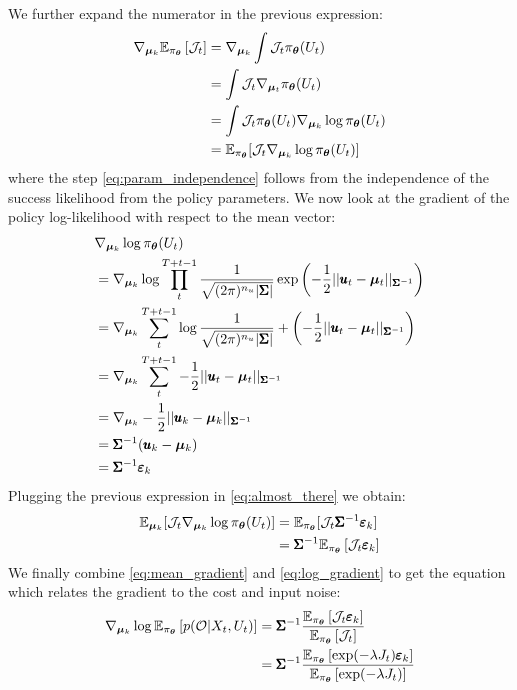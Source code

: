  We further expand the numerator in the previous expression:
\begin{align}
    \nabla_{\boldsymbol{\mu}_k} \mathbb{E}_{\pi_{\boldsymbol{\theta}}} \left [\mathcal{J}_t\right] 
    &= \nabla_{\boldsymbol{\mu}_k} \int \mathcal{J}_t \pi_{\boldsymbol{\theta}}(U_t) \label{eq:param_independence}\\
    &= \int \mathcal{J}_t \nabla_{\boldsymbol{\mu}_t} \pi_{\boldsymbol{\theta}}(U_t) \\
    &= \int \mathcal{J}_t \pi_{\boldsymbol{\theta}}(U_t) \nabla_{\boldsymbol{\mu}_k} \log \pi_{\boldsymbol{\theta}}(U_t) \\
    &= \mathbb{E}_{\pi_{\boldsymbol{\theta}}} [\mathcal{J}_t \nabla_{\boldsymbol{\mu}_k} \log \pi_{\boldsymbol{\theta}}(U_t)] \label{eq:almost_there}
\end{align}
where the step \eqref{eq:param_independence} follows from the independence of the success likelihood from the policy parameters. We now look at the gradient of the policy log-likelihood with respect to the mean vector:
\begin{align}
    &\nabla_{\boldsymbol{\mu}_k} \log \pi_{\boldsymbol{\theta}}(U_t) \\
    &= \nabla_{\boldsymbol{\mu}_k} \log \prod_{t}^{T+t-1} \frac{1}{\sqrt{(2\pi)^{n_u}|\pmb{\Sigma}|}}\exp\left(-\frac{1}{2}||\pmb{u}_t - \boldsymbol{\mu}_t||_{\pmb{\Sigma}^{-1}}\right) \\
    &= \nabla_{\boldsymbol{\mu}_k} \sum_{t}^{T+t-1} \log \frac{1}{\sqrt{(2\pi)^{n_u}|\pmb{\Sigma}|}} + \left(-\frac{1}{2}||\pmb{u}_t - \boldsymbol{\mu}_t||_{\pmb{\Sigma}^{-1}}\right) \\
    &= \nabla_{\boldsymbol{\mu}_k} \sum_{t}^{T+t-1} -\frac{1}{2}||\pmb{u}_t - \boldsymbol{\mu}_t||_{\pmb{\Sigma}^{-1}} \\
    &= \nabla_{\boldsymbol{\mu}_k} -\frac{1}{2}||\pmb{u}_k - \boldsymbol{\mu}_k||_{\pmb{\Sigma}^{-1}} \\
    &= \pmb{\Sigma}^{-1}(\pmb{u}_k - \boldsymbol{\mu}_k) \\
    &= \pmb{\Sigma}^{-1} \pmb{\varepsilon}_k
\end{align}
Plugging the previous expression in \eqref{eq:almost_there} we obtain:
\begin{align}
    \mathbb{E}_{\boldsymbol{\mu}_k} [\mathcal{J}_t \nabla_{\boldsymbol{\mu}_k} \log \pi_{\boldsymbol{\theta}}(U_t)]
    &= \mathbb{E}_{\pi_{\boldsymbol{\theta}}} [\mathcal{J}_t \pmb{\Sigma}^{-1} \pmb{\varepsilon}_k] \\
    &= \pmb{\Sigma}^{-1} \mathbb{E}_{\pi_{\boldsymbol{\theta}}} \left [\mathcal{J}_t \pmb{\varepsilon}_k\right] \label{eq:mean_gradient}
\end{align}
We finally combine \eqref{eq:mean_gradient} and \eqref{eq:log_gradient} to get the equation which relates the gradient to the cost and input noise:
\begin{align}
     \nabla_{\boldsymbol{\mu}_k} \log \mathbb{E}_{\pi_{\boldsymbol{\theta}}} \left [p(\mathcal{O} | X_t, U_t)\right] 
     &= \pmb{\Sigma}^{-1} \frac{\mathbb{E}_{\pi_{\boldsymbol{\theta}}} \left [\mathcal{J}_t \pmb{\varepsilon}_k\right]}{\mathbb{E}_{\pi_{\boldsymbol{\theta}}} \left [\mathcal{J}_t\right]} \\
     &= \pmb{\Sigma}^{-1} \frac{\mathbb{E}_{\pi_{\boldsymbol{\theta}}} \left [\exp(-\lambda J_t) \pmb{\varepsilon}_k\right]}{\mathbb{E}_{\pi_{\boldsymbol{\theta}}} \left [\exp(-\lambda J_t)\right]}
\end{align}


